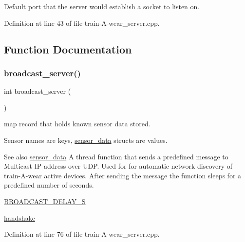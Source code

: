 Default port that the server would establish a socket to listen on. 



Definition at line 43 of file train-\/\+A-\/wear\+\_\+server.\+cpp.



\subsection{Function Documentation}
\mbox{\label{train-_a-wear__server_8cpp_a0fca5c05bd3ddbf5a153d3b9d43c25f1}} 
\subsubsection{\texorpdfstring{broadcast\_server()}{broadcast\_server()}}
{\footnotesize\ttfamily int broadcast\+\_\+server (\begin{DoxyParamCaption}{ }\end{DoxyParamCaption})}



map record that holds known sensor data stored. 

Sensor names are keys, \mbox{\hyperlink{structsensor__data}{sensor\+\_\+data}} structs are values. \begin{DoxySeeAlso}{See also}
\mbox{\hyperlink{structsensor__data}{sensor\+\_\+data}} A thread function that sends a predefined message to Multicast IP address over U\+DP. Used for for automatic network discovery of train-\/\+A-\/wear active devices. After sending the message the function sleeps for a predefined number of seconds.

\mbox{\hyperlink{train-_a-wear__server_8cpp_aa7a1101e9cec886e9ade667195fadb5a}{B\+R\+O\+A\+D\+C\+A\+S\+T\+\_\+\+D\+E\+L\+A\+Y\+\_\+S}} 

\mbox{\hyperlink{train-_a-wear__server_8cpp_a0f2faa14b725237d13bb7d2e8b7e3942}{handshake}} 
\end{DoxySeeAlso}


Definition at line 76 of file train-\/\+A-\/wear\+\_\+server.\+cpp.


